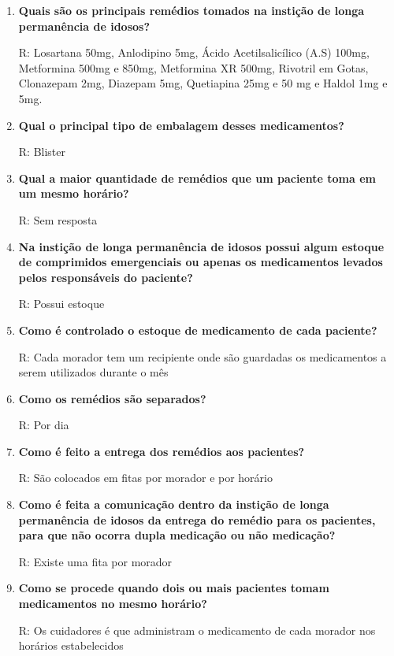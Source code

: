 \begin{apendicesenv}
\begin{enumerate}
    \item \textbf{Quais são os principais remédios tomados na instição de longa permanência de idosos?}
    
    R: Losartana 50mg, Anlodipino 5mg, Ácido Acetilsalicílico (A.S) 100mg, Metformina 500mg e 850mg, Metformina XR 500mg, Rivotril em Gotas, Clonazepam 2mg, Diazepam 5mg, Quetiapina 25mg e 50 mg e Haldol 1mg e 5mg.
    
    \item \textbf{Qual o principal tipo de embalagem desses medicamentos?}
    
    R: Blister
    
    \item \textbf{Qual a maior quantidade de remédios que um paciente toma em um mesmo horário?}
    
    R: Sem resposta
    
    \item \textbf{Na instição de longa permanência de idosos possui algum estoque de comprimidos emergenciais ou apenas os medicamentos levados pelos responsáveis do paciente?}
    
    R: Possui estoque
    
    \item \textbf{Como é controlado o estoque de medicamento de cada paciente?}
    
    R: Cada morador tem um recipiente onde são guardadas os medicamentos a serem utilizados durante o mês
    
    \item \textbf{Como os remédios são separados?}
    
    R: Por dia
    
    \item \textbf{Como é feito a entrega dos remédios aos pacientes?}
    
    R: São colocados em fitas por morador e por horário
    
    \item \textbf{Como é feita a comunicação dentro da instição de longa permanência de idosos da entrega do remédio para os pacientes, para que não ocorra dupla medicação ou não medicação?}
    
    R: Existe uma fita por morador
    
    \item \textbf{Como se procede quando dois ou mais pacientes tomam medicamentos no mesmo horário?}
    
    R: Os cuidadores é que administram o medicamento de cada morador nos horários estabelecidos
    

\end{enumerate}
\end{apendicesenv}
